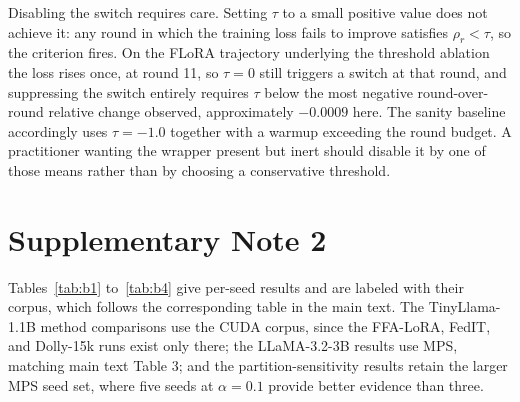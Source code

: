 \documentclass[pdflatex,sn-nature]{sn-jnl}
\begin{document}
Disabling the switch requires care. Setting $\tau$ to a small positive value does not achieve it: any round in which the training loss fails to improve satisfies $\rho_r < \tau$, so the criterion fires. On the FLoRA trajectory underlying the threshold ablation the loss rises once, at round 11, so $\tau{=}0$ still triggers a switch at that round, and suppressing the switch entirely requires $\tau$ below the most negative round-over-round relative change observed, approximately ${-}0.0009$ here. The sanity baseline accordingly uses $\tau{=}{-}1.0$ together with a warmup exceeding the round budget. A practitioner wanting the wrapper present but inert should disable it by one of those means rather than by choosing a conservative threshold.


\section*{Supplementary Note 2}
\label{app:perseed}
Tables~\ref{tab:b1} to~\ref{tab:b4} give per-seed results and are labeled with their corpus, which follows the corresponding table in the main text. The TinyLlama-1.1B method comparisons use the CUDA corpus, since the FFA-LoRA, FedIT, and Dolly-15k runs exist only there; the LLaMA-3.2-3B results use MPS, matching main text Table 3; and the partition-sensitivity results retain the larger MPS seed set, where five seeds at $\alpha{=}0.1$ provide better evidence than three.
\end{document}
